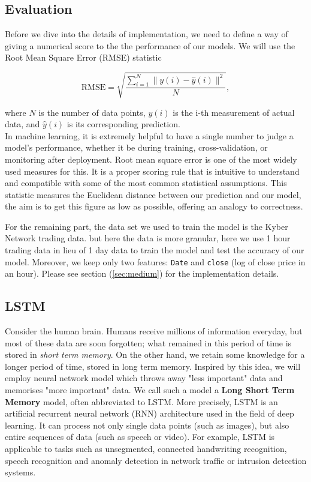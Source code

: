 \documentclass[twoside]{report}
\newcommand{\code}{\texttt}
\begin{document}
\begin{spacing}{1}
\subsection{Evaluation}
Before we dive into the details of implementation, we need to define a way of giving a numerical score to the the performance of our models. We will use the Root Mean Square Error (RMSE) statistic

\[
\textrm{RMSE} =\sqrt{\frac{\sum_{i=1}^{N}\|y(i)-\hat{y}(i)\|^{2}}{N}},
\]

where $N$ is the number of data points, $y(i)$ is the i-th measurement of actual data, and $\hat{y}(i)$ is its corresponding prediction.\\

In machine learning, it is extremely helpful to have a single number to judge a model’s performance, whether it be during training, cross-validation, or monitoring after deployment. Root mean square error is one of the most widely used measures for this. It is a proper scoring rule that is intuitive to understand and compatible with some of the most common statistical assumptions. \cite{hyndman2006another} This statistic measures the Euclidean distance between our prediction and our model, the aim is to get this figure as low as possible, offering an analogy to correctness.  

For the remaining part, the data set we used to train the model is the Kyber Network trading data. but here the data is more granular, here we use 1 hour trading data in lieu of 1 day data to train the model and test the accuracy of our model. Moreover, we keep only two features: \code{Date} and \code{close} (log of close price in an hour). Please see section (\ref{sec:medium}) for the implementation details.

\subsection{LSTM}

Consider the human brain. Humans receive millions of information everyday, but most of these data are soon forgotten; what remained in this period of time is stored in \textit{short term memory}. On the other hand, we retain some knowledge for a longer period of time, stored in long term memory. Inspired by this idea, we will employ neural network model which throws away "less important" data and memorises "more important" data. We call such a model a \textbf{Long Short Term Memory} model, often abbreviated to LSTM.
More precisely, LSTM is an artificial recurrent neural network (RNN) architecture used in the field of deep learning. It can process not only single data points (such as images), but also entire sequences of data (such as speech or video). For example, LSTM is applicable to tasks such as unsegmented, connected handwriting recognition, speech recognition and anomaly detection in network traffic or intrusion detection systems.\cite{greff2016lstm}


\end{spacing}
\end{document}
